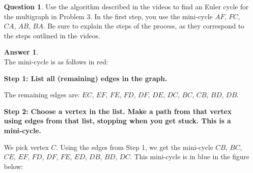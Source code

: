 \documentclass[article, 12pt]{article}
\theoremstyle{definition}
\newtheorem{question}{Question}
\newtheorem{answer}{Answer}
\begin{document}
    \begin{question}
        Use the algorithm described in the videos to find an Euler cycle for the multigraph in Problem 3. In the first step, you use the mini-cycle $AF$, $FC$, $CA$, $AB$, $BA$. Be sure to explain the steps of the process, as they correspond to the steps outlined in the videos.
    \end{question}
    \begin{answer} \ \\
        The mini-cycle is as follows in red:
        \begin{figure}[H]
            \centering
        \end{figure}
        \textbf{Step 1: List all (remaining) edges in the graph.}

        The remaining edges are: 
        $EC$, $EF$, $FE$, $FD$, $DF$, $DE$, $DC$, $BC$, $CB$, $BD$, $DB$.

        \textbf{Step 2: Choose a vertex in the list. Make a path from that vertex using edges from that list, stopping when you get stuck. This is a mini-cycle.}

        We pick vertex $C$. Using the edges from Step 1, we get the mini-cycle $CB$, $BC$, $CE$, $EF$, $FD$, $DF$, $FE$, $ED$, $DB$, $BD$, $DC$. This mini-cycle is in blue in the figure below:
        \begin{figure}[H]
            \centering
\end{figure}
\end{answer}
\end{document}
